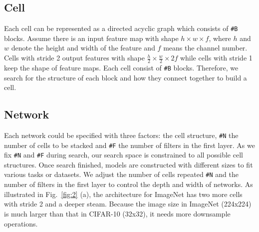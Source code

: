 \documentclass[10pt,twocolumn,letterpaper]{article}
\begin{document}
\subsection{Cell}
Each cell can be represented as a directed acyclic graph which consists of \texttt{\#B} blocks. Assume there is an input feature map with shape $h\times w \times f$, where $h$ and $w$ denote the height and width of the feature and $f$ means the channel number. Cells with stride 2 output features with shape $\frac{h}{2} \times \frac{w}{2} \times 2f$ while cells with stride 1 keep the shape of feature maps. Each cell consist of \texttt{\#B} blocks. Therefore, we search for the structure of each block and how they connect together to build a cell.

\subsection{Network}
Each network could be specified with three factors: the cell structure, \texttt{\#N} the number of cells to be stacked and \texttt{\#F} the number of filters in the first layer. As we fix \texttt{\#N} and \texttt{\#F} during search, our search space is constrained to all possible cell structures. Once search finished, models are constructed with different sizes to fit various tasks or datasets. We adjust the number of cells repeated \texttt{\#N} and the number of filters in the first layer to control the depth and width of networks. As illustrated in Fig.~\ref{fig:2} (a), the architecture for ImageNet has two more cells with stride 2 and a deeper steam. Because the image size in ImageNet (224x224) is much larger than that in CIFAR-10 (32x32), it needs more downsample operations.
\end{document}
